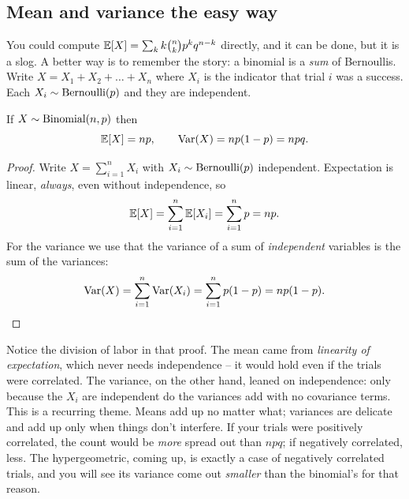 \subsection{Mean and variance the easy way}
\label{ch07:binom-moments}

You could compute $\operatorname{\mathbb{E}}[X] = \sum_k k \binom{n}{k} p^k q^{n-k}$ directly, and it can
be done, but it is a slog. A better way is to remember the story: a binomial
is a \emph{sum} of Bernoullis. Write $X = X_1 + X_2 + \dots + X_n$ where $X_i$ is
the indicator that trial $i$ was a success. Each $X_i \sim \operatorname{Bernoulli}(p)$ and they are
independent.

\begin{proposition}
\label{ch07:binom-mv}
If $X \sim \operatorname{Binomial}(n,p)$ then
\[
  \operatorname{\mathbb{E}}[X] = np, \qquad \operatorname{Var}(X) = np(1-p) = npq.
\]
\end{proposition}

\begin{proof}
Write $X = \sum_{i=1}^{n} X_i$ with $X_i \sim \operatorname{Bernoulli}(p)$ independent. Expectation
is linear, \emph{always}, even without independence, so
\[
  \operatorname{\mathbb{E}}[X] = \sum_{i=1}^{n} \operatorname{\mathbb{E}}[X_i] = \sum_{i=1}^{n} p = np.
\]
For the variance we use that the variance of a sum of \emph{independent} variables
is the sum of the variances:
\[
  \operatorname{Var}(X) = \sum_{i=1}^{n} \operatorname{Var}(X_i) = \sum_{i=1}^{n} p(1-p) = np(1-p). \qedhere
\]
\end{proof}

\begin{happeningbox}
Notice the division of labor in that proof. The mean came from \emph{linearity of
expectation}, which never needs independence -- it would hold even if the trials
were correlated. The variance, on the other hand, leaned on independence: only
because the $X_i$ are independent do the variances add with no covariance
terms. This is a recurring theme. Means add up no matter what;
variances are delicate and add up only when things don't interfere. If your
trials were positively correlated, the count would be \emph{more} spread out than
$npq$; if negatively correlated, less. The hypergeometric, coming up, is exactly a
case of negatively correlated trials, and you will see its variance come out
\emph{smaller} than the binomial's for that reason.
\end{happeningbox}

